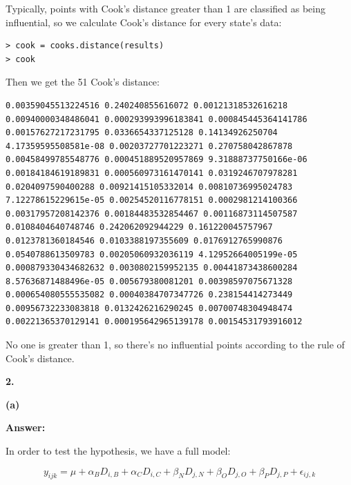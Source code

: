 \documentclass[letterpaper,11pt]{article}
\begin{document}
Typically, points with Cook's distance greater than 1 are classified as being influential, so we calculate Cook's distance for every state's data:
\begin{lstlisting}
> cook = cooks.distance(results)
> cook
\end{lstlisting}
Then we get the 51 Cook's distance:
\begin{lstlisting}
0.00359045513224516 0.240240855616072 0.00121318532616218 0.00940000348486041 0.000293993996183841 0.000845445364141786 0.00157627217231795 0.0336654337125128 0.14134926250704 4.17359595508581e-08 0.00203727701223271 0.270758042867878 0.00458499785548776 0.000451889520957869 9.31888737750166e-06 0.00184184619189831 0.000560973161470141 0.0319246707978281 0.0204097590400288 0.00921415105332014 0.00810736995024783 7.12278615229615e-05 0.00254520116778151 0.0002981214100366 0.00317957208142376 0.00184483532854467 0.00116873114507587 0.0108404640748746 0.242062092944229 0.161220045757967 0.0123781360184546 0.0103388197355609 0.0176912765990876 0.0540788613509783 0.00205060932036119 4.12952664005199e-05 0.000879330434682632 0.0030802159952135 0.00441873438600284 8.57636871488496e-05 0.005679380081201 0.00398597075671328 0.000654080555535082 0.00040384707347726 0.238154414273449 0.00956732233083818 0.0132426216290245 0.00700748304948474 0.00221365370129141 0.000195642965139178 0.00154531793916012
\end{lstlisting}
No one is greater than 1, so there's no influential points according to the rule of Cook's distance.


\begin{addmargin}[-2em]{0em}
  \large{\textbf{2. }}
\end{addmargin}

\begin{addmargin}[-1.1em]{0em}
  \textbf{(a)}\par
\end{addmargin}
\textbf{}\par
\bigbreak
\begin{addmargin}[-0.5em]{0em}
  \textbf{Answer: }
\end{addmargin}

In order to test the hypothesis, we have a full model:

$$y_{ijk} = \mu + \alpha_BD_{i,B} + \alpha_CD_{i,C} + \beta_ND_{j,N} + \beta_OD_{j,O} + \beta_PD_{j,P} + \epsilon_{ij,k}$$
\end{document}

